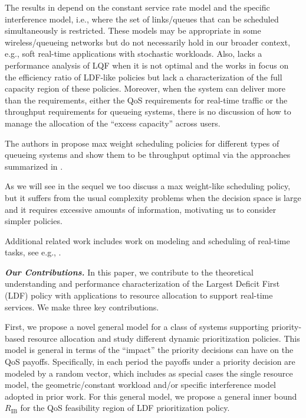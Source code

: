 \documentclass[prodmode,acmtompecs]{acmsmall}
\newcommand{\myComments}[1]{}
\newif\ifextended
\newcommand{\extendedStart}{\ifextended  \myComments{Extended version: }}
\newcommand{\commentEnd}{\myComments{End}}
\begin{document}
The results in \cite{DiW06,JLS07,KWJ13} depend on the constant service rate model and the specific interference model, i.e., where the set of links/queues that can be scheduled simultaneously is restricted. 
These models may be appropriate in some wireless/queueing networks but do not necessarily hold in our broader context, e.g., soft real-time applications with stochastic workloads. Also, \cite{DiW06} lacks a performance analysis of LQF when it is not optimal and the works in \cite{JLS07,KWJ13} focus on the efficiency ratio of LDF-like policies but lack a characterization of the full capacity region of these policies. 
Moreover, when the system can deliver more than the requirements, either the QoS requirements for real-time traffic or the throughput requirements for queueing systems, there is no discussion of how to manage the allocation of the ``excess capacity'' across users. 

The authors in \cite{TaE92,TaE93,MMA99,DaP00,Sto04} propose max weight 
scheduling policies for different types of queueing systems and show them to be throughput optimal 
via the approaches summarized in \cite{DoM94,DoM97,MeT08}. 
\extendedStart
The authors in \cite{Nee09} and \cite{VBY13} further 
characterize the delay of the max weight policy, and study its inefficiency in spatial wireless networks, respectively. 
\commentEnd\fi
As we will see in the sequel we too discuss a max weight-like scheduling policy, but it suffers from the usual complexity problems when the decision space
is large and it requires excessive amounts of information, motivating us to consider simpler policies. 

Additional related work includes work on modeling and scheduling of real-time tasks, see e.g., \cite{SAA04,DaB11,LiI08,ShS02}. 

{\bf \em Our Contributions. }
In this paper, we contribute to the theoretical understanding and performance characterization of the Largest Deficit First (LDF) policy with applications to resource allocation to support real-time services. We make three key contributions. 

First, we propose a novel general model for a class of systems supporting priority-based resource allocation 
and study different dynamic prioritization policies. This model is general in terms of the ``impact'' the priority decisions can have on the QoS payoffs. Specifically, in each period the payoffs under a priority decision are modeled by a random vector, which includes as special cases the single resource model, the geometric/constant workload and/or specific interference model adopted in prior work. 
For this general model, we propose a general inner bound $R_\text{IB}$ for the QoS feasibility region of LDF prioritization policy. 
\end{document}
